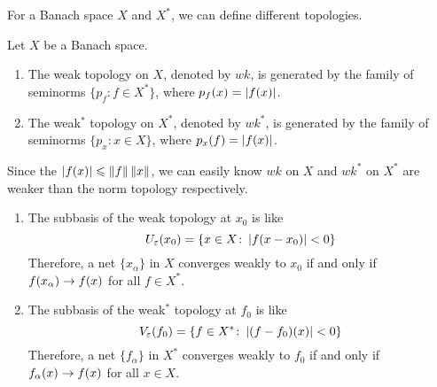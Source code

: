 \documentclass[a4paper,11pt]{report}
\begin{document}
For a Banach space $X$ and $X^{*}$, we can define different topologies.

\begin{defn}
	Let $X$ be a Banach space.
	\begin{enumerate}[label=\arabic*)]
		\item The weak topology on $X$, denoted by $wk$, is generated by the family of seminorms $\{p_f \colon f \in X^{*}\}$, where $p_f(x) = \left\lvert f(x)\right\lvert$.
		\item The weak$^{*}$ topology on $X^{*}$, denoted by $wk^{*}$, is generated by the family of seminorms $\{p_x \colon x \in X\}$, where $p_x(f) = \left\lvert f(x)\right\lvert$.
	\end{enumerate}
\end{defn}
\begin{rem}
	Since the $\left\lvert f(x)\right\lvert \leqslant \left\lVert f\right\lVert\left\lVert x\right\lVert$, we can easily know $wk$ on $X$ and $wk^{*}$ on $X^{*}$ are weaker than the norm topology respectively. 
	\begin{enumerate}[label=\arabic*)]
		\item The subbasis of the weak topology at $x_0$ is like 
			\begin{equation*}
				U_\varepsilon(x_0) = \{x \in X \colon \left\lvert f(x-x_0)\right\lvert < 0\}
			\end{equation*}
		Therefore, a net $\{x_\alpha\}$ in $X$ converges weakly to $x_0$ if and only if $f(x_\alpha) \rightarrow f(x)$ for all $f \in X^{*}$.
		\item The subbasis of the weak$^{*}$ topology at $f_0$ is like
			\begin{equation*}
				V_\varepsilon(f_0) = \{f \in X^{*} \colon \left\lvert(f-f_0)(x)\right\lvert < 0\}
			\end{equation*}
		Therefore, a net $\{f_\alpha\}$ in $X^{*}$ converges weakly to $f_0$ if and only if $f_\alpha(x) \rightarrow f(x)$ for all $x \in X$.
	\end{enumerate}
\end{rem}
\end{document}
